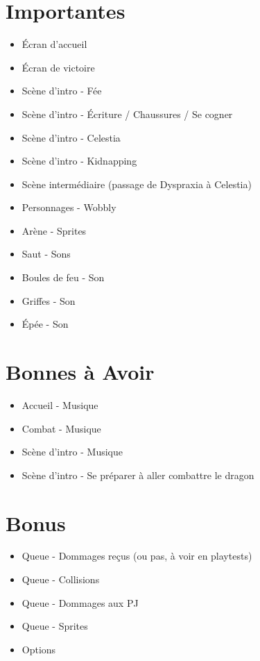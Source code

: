 \documentclass{scrartcl}
\begin{document}
	\section{Importantes}
	\begin{itemize}
		\item Écran d'accueil
		\item Écran de victoire
		\item Scène d'intro - Fée
		\item Scène d'intro - Écriture / Chaussures / Se cogner
		\item Scène d'intro - Celestia
		\item Scène d'intro - Kidnapping
		\item Scène intermédiaire (passage de Dyspraxia à Celestia)
		\item Personnages - Wobbly 
		\item Arène - Sprites
		\item Saut - Sons
		\item Boules de feu - Son
		\item Griffes - Son
		\item Épée - Son
	\end{itemize}
	\section{Bonnes à Avoir}
	\begin{itemize}
	\item Accueil - Musique
	\item Combat - Musique
	\item Scène d'intro - Musique
	\item Scène d'intro - Se préparer à aller combattre le dragon
	\end{itemize}
	\section{Bonus}
	\begin{itemize}
		\item Queue - Dommages reçus (ou pas, à voir en playtests)
		\item Queue - Collisions
		\item Queue - Dommages aux PJ 
		\item Queue - Sprites
		\item Options
	\end{itemize}
	
\end{document}
